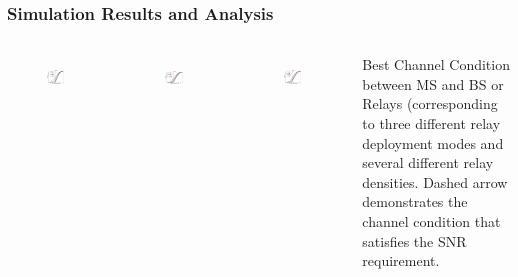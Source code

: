 \documentclass{beamer}
\begin{document}
%
\begin{frame}
\frametitle{Simulation Results and Analysis}
\begin{columns}[c]
\begin{figure}
\includegraphics[width=4.5cm]{Mode1_bestchannelgain_V2.eps}
\label{Mode1}
\end{figure}
\begin{figure}
\includegraphics[width=4.5cm]{Mode2_bestchannelgain_V2.eps}
\label{Mode2}
\end{figure}
\begin{figure}
\includegraphics[width=4.5cm]{Mode3_bestchannelgain_V2.eps}
\label{Mode3}
\end{figure}
Best Channel Condition between MS and BS or Relays (corresponding to three different relay deployment modes and several different relay densities. Dashed arrow demonstrates the channel condition that satisfies the SNR requirement.
\end{columns}
\end{frame}
\end{document}

